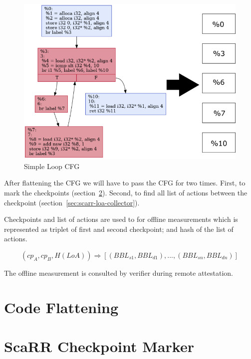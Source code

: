\begin{figure}[htbp]
\centerline{\includegraphics[scale=.70]{Figures/04/flatten-cfg.png}}
\caption{Simple Loop CFG}
\label{fig:simple-loop-cfg}
\end{figure}

After flattening the CFG we will have to pass the CFG for two times. First, to
mark the checkpoints (section~\ref{sec:scarr-checkpoint-marker}). Second, to
find all list of actions between the checkpoint
(section~\ref{sec:scarr-loa-collector}).

Checkpoints and list of actions are used to for offline measurements which is
represented as triplet of first and second checkpoint; and hash of the list of
actions.

$$(cp_A, cp_B, H(LoA)) \Rightarrow [(BBL_{s1}, BBL_{d1}), ..., (BBL_{sn},
BBL_{dn})]$$

The offline measurement is consulted by verifier during remote attestation.

\section{Code Flattening}
\label{sec:code-flattening}


\section{ScaRR Checkpoint Marker} 
\label{sec:scarr-checkpoint-marker}

